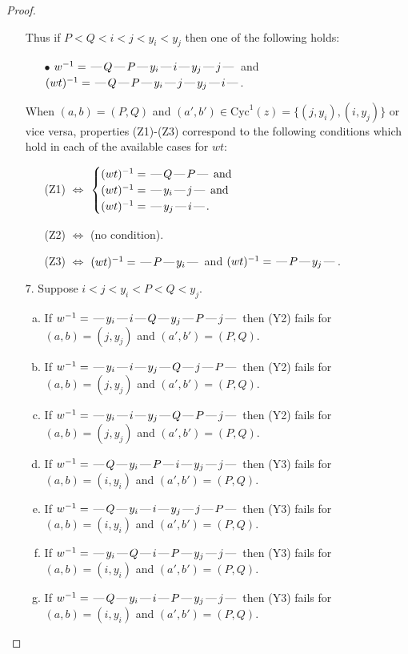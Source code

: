 \documentclass[10pt]{article}
\theoremstyle{definition}
\theoremstyle{definition}
\def\dash{\text{\hspace{0.5mm}---\hspace{0.5mm}}}
\def\Cyc{\mathrm{Cyc}}
\begin{document}
\begin{proof}
\begin{enumerate}
\begin{enumerate}[(a)]
\end{enumerate}
Thus if $P < Q < i < j < y_i < y_j$ then one of the following holds:
\begin{enumerate}
\item[$\bullet$] $w^{-1} = \dash Q\dash P\dash y_i\dash i\dash y_j\dash j\dash $ and $(wt)^{-1} = \dash Q\dash P\dash y_i\dash j\dash y_j\dash i\dash $.
\end{enumerate}
When $(a,b)= (P,Q)$ and $(a',b')\in \Cyc^1(z)=\{(j,y_i),(i,y_j)\}$ or vice versa,
properties (Z1)-(Z3) correspond to the following conditions which
hold in each of the available cases for $wt$:
\begin{enumerate}
\item[](Z1) $\Leftrightarrow$ $\begin{cases}\text{$(wt)^{-1} = \dash Q \dash P \dash$}\text{ and }\\
\text{$(wt)^{-1} = \dash y_i \dash j \dash$}\text{ and }\\
\text{$(wt)^{-1} = \dash y_j \dash i \dash$}.\end{cases}$
\item[](Z2) $\Leftrightarrow$ (no condition).
\item[](Z3) $\Leftrightarrow$ $(wt)^{-1} = \dash P \dash y_i \dash$  and $(wt)^{-1} = \dash P \dash y_j \dash$.
\end{enumerate}
\item[$7$.] Suppose $i < j < y_i < P < Q < y_j$.
\begin{enumerate}[(a)]
\item If $w^{-1} = \dash y_i\dash i\dash Q\dash y_j\dash P\dash j\dash $ then (Y2) fails for $(a,b)=(j,y_j)$ and $(a',b')=(P,Q)$.
\item If $w^{-1} = \dash y_i\dash i\dash y_j\dash Q\dash j\dash P\dash $ then (Y2) fails for $(a,b)=(j,y_j)$ and $(a',b')=(P,Q)$.
\item If $w^{-1} = \dash y_i\dash i\dash y_j\dash Q\dash P\dash j\dash $ then (Y2) fails for $(a,b)=(j,y_j)$ and $(a',b')=(P,Q)$.
\item If $w^{-1} = \dash Q\dash y_i\dash P\dash i\dash y_j\dash j\dash $ then (Y3) fails for $(a,b)=(i,y_i)$ and $(a',b')=(P,Q)$.
\item If $w^{-1} = \dash Q\dash y_i\dash i\dash y_j\dash j\dash P\dash $ then (Y3) fails for $(a,b)=(i,y_i)$ and $(a',b')=(P,Q)$.
\item If $w^{-1} = \dash y_i\dash Q\dash i\dash P\dash y_j\dash j\dash $ then (Y3) fails for $(a,b)=(i,y_i)$ and $(a',b')=(P,Q)$.
\item If $w^{-1} = \dash Q\dash y_i\dash i\dash P\dash y_j\dash j\dash $ then (Y3) fails for $(a,b)=(i,y_i)$ and $(a',b')=(P,Q)$.

\end{enumerate}
\end{enumerate}
\end{proof}
\end{document}
